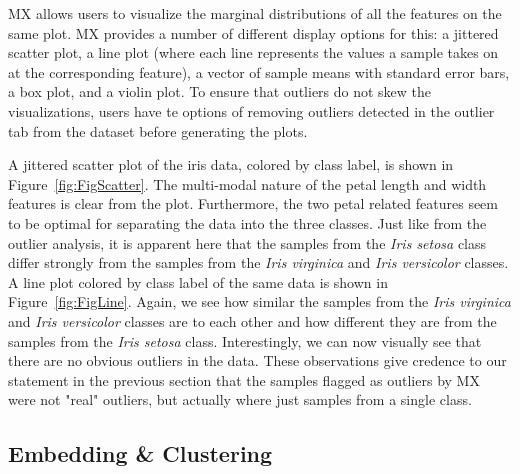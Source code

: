 \documentclass[twoside,leqno,twocolumn]{article}
\begin{document}
MX allows users to visualize the marginal distributions of all the features on the same plot. MX provides a number of different display options for this: a jittered scatter plot, a line plot (where each line represents the values a sample takes on at the corresponding feature), a vector of sample means with standard error bars, a box plot, and a violin plot. To ensure that outliers do not skew the visualizations, users have te options of removing outliers detected in the outlier tab from the dataset before generating the plots. 

A jittered scatter plot of the iris data, colored by class label, is shown in Figure~\ref{fig:FigScatter}. The multi-modal nature of the petal length and width features is clear from the plot. Furthermore, the two petal related features seem to be optimal for separating the data into the three classes. Just like from the outlier analysis, it is apparent here that the samples from the \textit{Iris setosa} class differ strongly from the samples from the \textit{Iris virginica} and \textit{Iris versicolor} classes. A line plot colored by class label of the same data is shown in Figure~\ref{fig:FigLine}. Again, we see how similar the samples from the \textit{Iris virginica} and \textit{Iris versicolor} classes are to each other and how different they are from the samples from the \textit{Iris setosa} class. Interestingly, we can now visually see that there are no obvious outliers in the data. These observations give credence to our statement in the previous section that the samples flagged as outliers by MX were not "real" outliers, but actually where just samples from a single class.

\subsection{Embedding \& Clustering}
\label{subsec:SubSecEmbedding}
\end{document}
